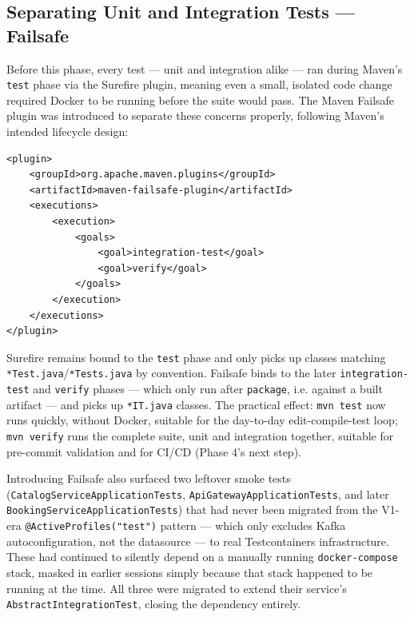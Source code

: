 \subsection{Separating Unit and Integration Tests --- Failsafe}
\label{sec:failsafe}

Before this phase, every test --- unit and integration alike --- ran during Maven's \texttt{test} phase via the Surefire plugin, meaning even a small, isolated code change required Docker to be running before the suite would pass. The Maven Failsafe plugin was introduced to separate these concerns properly, following Maven's intended lifecycle design:

\begin{lstlisting}[style=yamlstyle, caption={Failsafe plugin configuration (added to all five services)}]
<plugin>
    <groupId>org.apache.maven.plugins</groupId>
    <artifactId>maven-failsafe-plugin</artifactId>
    <executions>
        <execution>
            <goals>
                <goal>integration-test</goal>
                <goal>verify</goal>
            </goals>
        </execution>
    </executions>
</plugin>
\end{lstlisting}

Surefire remains bound to the \texttt{test} phase and only picks up classes matching \texttt{*Test.java}/\texttt{*Tests.java} by convention. Failsafe binds to the later \texttt{integration-test} and \texttt{verify} phases --- which only run after \texttt{package}, i.e. against a built artifact --- and picks up \texttt{*IT.java} classes. The practical effect: \texttt{mvn test} now runs quickly, without Docker, suitable for the day-to-day edit-compile-test loop; \texttt{mvn verify} runs the complete suite, unit and integration together, suitable for pre-commit validation and for CI/CD (Phase 4's next step).

Introducing Failsafe also surfaced two leftover smoke tests (\texttt{CatalogServiceApplicationTests}, \texttt{ApiGatewayApplicationTests}, and later \texttt{BookingServiceApplicationTests}) that had never been migrated from the V1-era \texttt{@ActiveProfiles("test")} pattern --- which only excludes Kafka autoconfiguration, not the datasource --- to real Testcontainers infrastructure. These had continued to silently depend on a manually running \texttt{docker-compose} stack, masked in earlier sessions simply because that stack happened to be running at the time. All three were migrated to extend their service's \texttt{AbstractIntegrationTest}, closing the dependency entirely.

